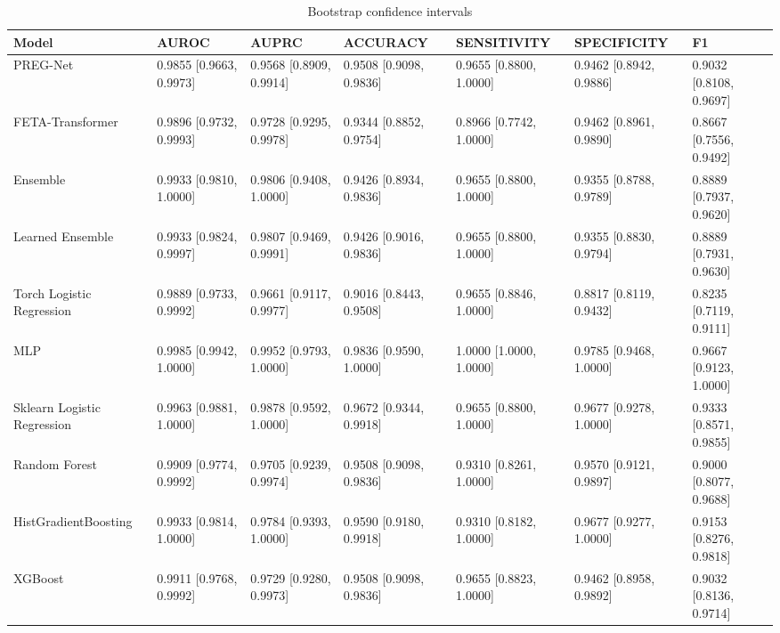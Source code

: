 \begin{table}[ht]
\centering
\caption{Bootstrap confidence intervals}
\label{tab:confidence-intervals}
\begin{tabular}{lllllll}
\hline
Model & AUROC & AUPRC & ACCURACY & SENSITIVITY & SPECIFICITY & F1 \\
\hline
PREG-Net & 0.9855 [0.9663, 0.9973] & 0.9568 [0.8909, 0.9914] & 0.9508 [0.9098, 0.9836] & 0.9655 [0.8800, 1.0000] & 0.9462 [0.8942, 0.9886] & 0.9032 [0.8108, 0.9697] \\
FETA-Transformer & 0.9896 [0.9732, 0.9993] & 0.9728 [0.9295, 0.9978] & 0.9344 [0.8852, 0.9754] & 0.8966 [0.7742, 1.0000] & 0.9462 [0.8961, 0.9890] & 0.8667 [0.7556, 0.9492] \\
Ensemble & 0.9933 [0.9810, 1.0000] & 0.9806 [0.9408, 1.0000] & 0.9426 [0.8934, 0.9836] & 0.9655 [0.8800, 1.0000] & 0.9355 [0.8788, 0.9789] & 0.8889 [0.7937, 0.9620] \\
Learned Ensemble & 0.9933 [0.9824, 0.9997] & 0.9807 [0.9469, 0.9991] & 0.9426 [0.9016, 0.9836] & 0.9655 [0.8800, 1.0000] & 0.9355 [0.8830, 0.9794] & 0.8889 [0.7931, 0.9630] \\
Torch Logistic Regression & 0.9889 [0.9733, 0.9992] & 0.9661 [0.9117, 0.9977] & 0.9016 [0.8443, 0.9508] & 0.9655 [0.8846, 1.0000] & 0.8817 [0.8119, 0.9432] & 0.8235 [0.7119, 0.9111] \\
MLP & 0.9985 [0.9942, 1.0000] & 0.9952 [0.9793, 1.0000] & 0.9836 [0.9590, 1.0000] & 1.0000 [1.0000, 1.0000] & 0.9785 [0.9468, 1.0000] & 0.9667 [0.9123, 1.0000] \\
Sklearn Logistic Regression & 0.9963 [0.9881, 1.0000] & 0.9878 [0.9592, 1.0000] & 0.9672 [0.9344, 0.9918] & 0.9655 [0.8800, 1.0000] & 0.9677 [0.9278, 1.0000] & 0.9333 [0.8571, 0.9855] \\
Random Forest & 0.9909 [0.9774, 0.9992] & 0.9705 [0.9239, 0.9974] & 0.9508 [0.9098, 0.9836] & 0.9310 [0.8261, 1.0000] & 0.9570 [0.9121, 0.9897] & 0.9000 [0.8077, 0.9688] \\
HistGradientBoosting & 0.9933 [0.9814, 1.0000] & 0.9784 [0.9393, 1.0000] & 0.9590 [0.9180, 0.9918] & 0.9310 [0.8182, 1.0000] & 0.9677 [0.9277, 1.0000] & 0.9153 [0.8276, 0.9818] \\
XGBoost & 0.9911 [0.9768, 0.9992] & 0.9729 [0.9280, 0.9973] & 0.9508 [0.9098, 0.9836] & 0.9655 [0.8823, 1.0000] & 0.9462 [0.8958, 0.9892] & 0.9032 [0.8136, 0.9714] \\
\hline
\end{tabular}
\end{table}
